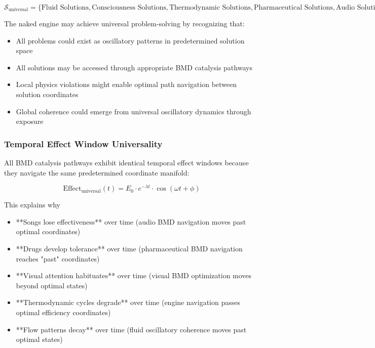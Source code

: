 \documentclass[11pt,a4paper]{article}
\theoremstyle{remark}
\begin{document}
\begin{equation}
\mathcal{S}_{\text{universal}} = \{\text{Fluid Solutions}, \text{Consciousness Solutions}, \text{Thermodynamic Solutions}, \text{Pharmaceutical Solutions}, \text{Audio Solutions}, \text{Visual Solutions}\}
\end{equation}

The naked engine may achieve universal problem-solving by recognizing that:
\begin{itemize}
\item All problems could exist as oscillatory patterns in predetermined solution space
\item All solutions may be accessed through appropriate BMD catalysis pathways
\item Local physics violations might enable optimal path navigation between solution coordinates
\item Global coherence could emerge from universal oscillatory dynamics through exposure
\end{itemize}

\subsubsection{Temporal Effect Window Universality}

All BMD catalysis pathways exhibit identical temporal effect windows because they navigate the same predetermined coordinate manifold:

\begin{equation}
\text{Effect}_{\text{universal}}(t) = E_0 \cdot e^{-\lambda t} \cdot \cos(\omega t + \phi)
\end{equation}

This explains why
\begin{itemize}
\item **Songs lose effectiveness** over time (audio BMD navigation moves past optimal coordinates)
\item **Drugs develop tolerance** over time (pharmaceutical BMD navigation reaches "past" coordinates)  
\item **Visual attention habituates** over time (visual BMD optimization moves beyond optimal states)
\item **Thermodynamic cycles degrade** over time (engine navigation passes optimal efficiency coordinates)
\item **Flow patterns decay** over time (fluid oscillatory coherence moves past optimal states)
\end{itemize}
\end{document}
